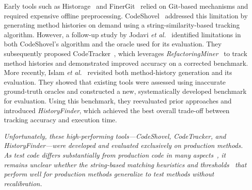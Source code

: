 Early tools such as Historage~\cite{hata_2011} and FinerGit~\cite{HIGO:2020} relied on Git-based mechanisms and required expensive offline preprocessing. CodeShovel~\cite{grund:2021} addressed this limitation by generating method histories on demand using a string-similarity-based tracking algorithm. However, a follow-up study by Jodavi \textit{et al.}~\cite{jodavi_accurate_2022} identified limitations in both CodeShovel's algorithm and the oracle used for its evaluation. They subsequently proposed CodeTracker~\cite{jodavi_accurate_2022}, which leverages \emph{RefactoringMiner}~\cite{tsantalis2020refactoringminer} to track method histories and demonstrated improved accuracy on a corrected benchmark. More recently, Islam \textit{et al.}~\cite{islam_historyfinder_2025} revisited both method-history generation and its evaluation. They showed that existing tools were assessed using inaccurate ground-truth oracles and constructed a new, systematically developed benchmark for evaluation. Using this benchmark, they reevaluated prior approaches and introduced \emph{HistoryFinder}, which achieved the best overall trade-off between tracking accuracy and execution time.

\emph{Unfortunately, these high-performing tools—CodeShovel, CodeTracker, and HistoryFinder—were developed and evaluated exclusively on production methods. As test code differs substantially from production code in many aspects~\cite{van2021comparative,horikawa2025does,zaidman2011studying}, it remains unclear whether the string-based matching heuristics and thresholds~\cite{grund:2021, islam_historyfinder_2025} that perform well for production methods generalize to test methods without recalibration.}


